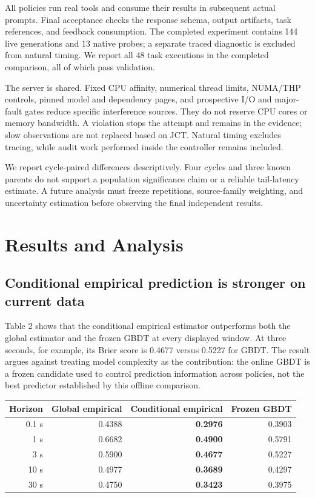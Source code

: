 \documentclass[sigconf, screen, review]{acmart}
\newenvironment{longtable}[2][]{%
  \begin{table}[t]\centering\small\begin{tabular}{#2}%
}{%
  \end{tabular}\end{table}%
}
\def\endhead{}
\def\endlastfoot{}
\begin{document}
All policies run real tools and consume their results in subsequent
actual prompts. Final acceptance checks the response schema, output
artifacts, task references, and feedback consumption. The completed
experiment contains 144 live generations and 13 native probes; a
separate traced diagnostic is excluded from natural timing. We report
all 48 task executions in the completed comparison, all of which pass
validation.

The server is shared. Fixed CPU affinity, numerical thread limits,
NUMA/THP controls, pinned model and dependency pages, and prospective
I/O and major-fault gates reduce specific interference sources. They do
not reserve CPU cores or memory bandwidth. A violation stops the attempt
and remains in the evidence; slow observations are not replaced based on
JCT. Natural timing excludes tracing, while audit work performed inside
the controller remains included.

We report cycle-paired differences descriptively. Four cycles and three
known parents do not support a population significance claim or a
reliable tail-latency estimate. A future analysis must freeze
repetitions, source-family weighting, and uncertainty estimation before
observing the final independent results.

\section{Results and Analysis}\label{results-and-analysis}

\subsection{Conditional empirical prediction is stronger on current
data}\label{conditional-empirical-prediction-is-stronger-on-current-data}

Table 2 shows that the conditional empirical estimator outperforms both
the global estimator and the frozen GBDT at every displayed window. At
three seconds, for example, its Brier score is 0.4677 versus 0.5227 for
GBDT. The result argues against treating model complexity as the
contribution: the online GBDT is a frozen candidate used to control
prediction information across policies, not the best predictor
established by this offline comparison.

\begin{longtable}[]{@{}rrrr@{}}
\toprule\noalign{}
Horizon & Global empirical & Conditional empirical & Frozen GBDT \\
\midrule\noalign{}
\endhead
\bottomrule\noalign{}
\endlastfoot
0.1 s & 0.4388 & \textbf{0.2976} & 0.3903 \\
1 s & 0.6682 & \textbf{0.4900} & 0.5791 \\
3 s & 0.5900 & \textbf{0.4677} & 0.5227 \\
10 s & 0.4977 & \textbf{0.3689} & 0.4297 \\
30 s & 0.4750 & \textbf{0.3423} & 0.3975 \\
\end{longtable}
\end{document}
